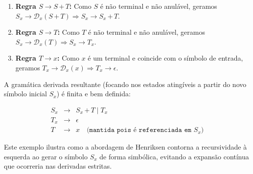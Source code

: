 \begin{enumerate}
    \item \textbf{Regra $S \to S \, \texttt{+} \, T$:} Como $S$ é não terminal e não anulável, geramos $S_x \to \mathcal{D}_x(S \, \texttt{+} \, T) \Rightarrow S_x \to S_x \, \texttt{+} \, T$.
    \item \textbf{Regra $S \to T$:} Como $T$ é não terminal e não anulável, geramos $S_x \to \mathcal{D}_x(T) \Rightarrow S_x \to T_x$.
    \item \textbf{Regra $T \to x$:} Como $x$ é um terminal e coincide com o símbolo de entrada, geramos $T_x \to \mathcal{D}_x(x) \Rightarrow T_x \to \epsilon$.
\end{enumerate}

A gramática derivada resultante (focando nos estados atingíveis a partir do novo símbolo inicial $S_x$) é finita e bem definida:

\[
\begin{array}{lcl}
S_x & \to & S_x \, \texttt{+} \, T \;|\; T_x \\
T_x & \to & \epsilon \\
T & \to & x \quad \texttt{(mantida pois é referenciada em } S_x \texttt{)}
\end{array}
\]

Este exemplo ilustra como a abordagem de Henriksen contorna a recursividade à esquerda ao gerar o símbolo $S_x$ de forma simbólica, evitando a expansão contínua que ocorreria nas derivadas estritas.


